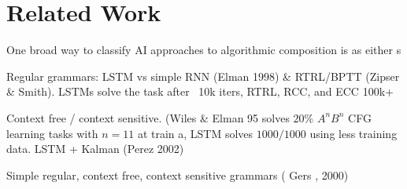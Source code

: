 \documentclass[dissertation.tex]{subfiles}
\begin{document}
\chapter{Related Work}





One broad way to classify AI approaches to algorithmic composition is
as either s


Regular grammars: LSTM vs simple RNN (Elman 1998) \& RTRL/BPTT (Zipser \& Smith).
LSTMs solve the task after ~10k iters, RTRL, RCC, and ECC 100k+

Context free / context sensitive. (Wiles \& Elman 95 solves $20\%$ $A^n B^n$ CFG learning tasks with
$n = 11$ at train a, LSTM solves $1000/1000$ using less training data. LSTM + Kalman (Perez 2002)

Simple regular, context free, context sensitive grammars ( Gers , 2000)

\end{document}
